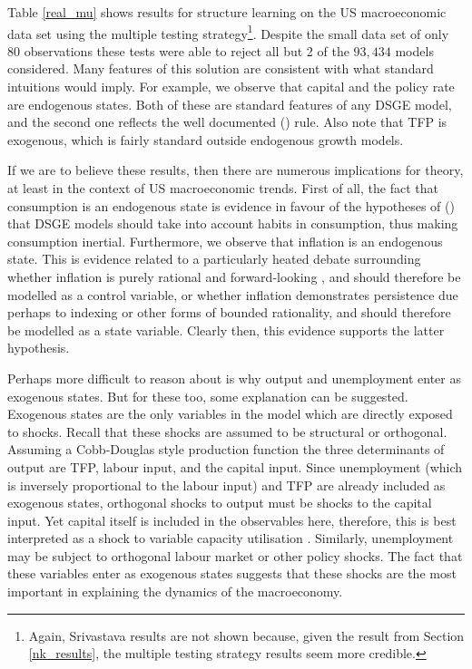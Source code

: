 \documentclass{article}
\begin{document}
Table \ref{real_mu} shows results for structure learning on the US macroeconomic data set using the multiple testing strategy\footnote{Again, Srivastava results are not shown because, given the result from Section \ref{nk_results}, the multiple testing strategy results seem more credible.}. Despite the small data set of only 80 observations these tests were able to reject all but 2 of the $93,434$ models considered. Many features of this solution are consistent with what standard intuitions would imply. For example, we observe that capital and the policy rate are endogenous states. Both of these are standard features of any DSGE model, and the second one reflects the well documented \citeauthor{taylor1993discretion} (\citeyear{taylor1993discretion}) rule. Also note that TFP is exogenous, which is fairly standard outside endogenous growth models.

If we are to believe these results, then there are numerous implications for theory, at least in the context of US macroeconomic trends. First of all, the fact that consumption is an endogenous state is evidence in favour of the hypotheses of \citeauthor{fuhrer2000habit} (\citeyear{fuhrer2000habit}) that DSGE models should take into account habits in consumption, thus making consumption inertial. Furthermore, we observe that inflation is an endogenous state. This is evidence related to a particularly heated debate surrounding whether inflation is purely rational and forward-looking \parencite{levin2004macroeconomic}, and should therefore be modelled as a control variable, or whether inflation demonstrates persistence \parencite{christiano2005nominal} due perhaps to indexing or other forms of bounded rationality, and should therefore be modelled as a state variable. Clearly then, this evidence supports the latter hypothesis. 

Perhaps more difficult to reason about is why output and unemployment enter as exogenous states. But for these too, some explanation can be suggested. Exogenous states are the only variables in the model which are directly exposed to shocks. Recall that these shocks are assumed to be structural or orthogonal. Assuming a Cobb-Douglas style production function the three determinants of output are TFP, labour input, and the capital input. Since unemployment (which is inversely proportional to the labour input) and TFP are already included as exogenous states, orthogonal shocks to output must be shocks to the capital input. Yet capital itself is included in the observables here, therefore, this is best interpreted as a shock to variable capacity utilisation \parencite{driver2000capacity}. Similarly, unemployment may be subject to orthogonal labour market or other policy shocks. The fact that these variables enter as exogenous states suggests that these shocks are the most important in explaining the dynamics of the macroeconomy.
\end{document}
